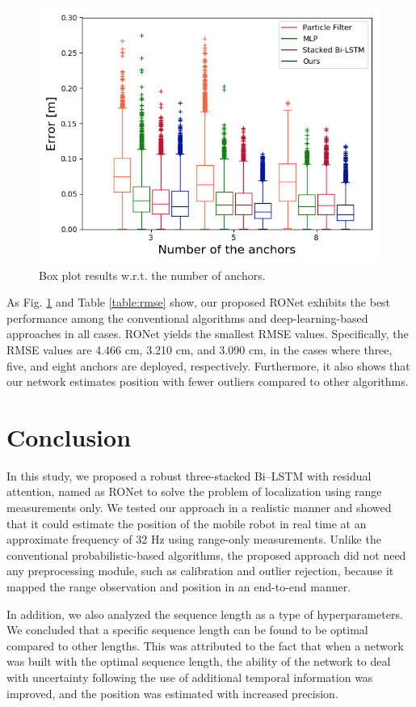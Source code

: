 \documentclass[letterpaper, 10 pt, conference]{ieeeconf}
\begin{document}
\begin{figure}[h]
	\centering
	\includegraphics[width=0.9\linewidth]{image/boxcompare}
	\caption{Box plot results w.r.t. the number of anchors.}
	\label{fig:box_plot} 	
\end{figure}

As Fig. \ref{fig:box_plot} and Table \ref{table:rmse} show, our proposed RONet exhibits the best performance among the conventional algorithms and deep-learning-based approaches in all cases. RONet yields the smallest RMSE values. Specifically, the RMSE values are 4.466 cm, 3.210 cm, and 3.090 cm, in the cases where three, five, and eight anchors are deployed, respectively. Furthermore, it also shows that our network estimates position with fewer outliers compared to other algorithms. 

\section{Conclusion}

In this study, we proposed a robust three-stacked Bi--LSTM with residual attention, named as RONet to solve the problem of localization using range measurements only. We tested our approach in a realistic manner and showed that it could estimate the position of the mobile robot in real time at an approximate frequency of 32 Hz using range-only measurements. Unlike the conventional probabilistic-based algorithms, the proposed approach did not need any preprocessing module, such as calibration and outlier rejection, because it mapped the range observation and position in an end-to-end manner.

In addition, we also analyzed the sequence length as a type of hyperparameters. We concluded that a specific sequence length can be found to be optimal compared to other lengths. This was attributed to the fact that when a network was built with the optimal sequence length, the ability of the network to deal with uncertainty following the use of additional temporal information was improved, and the position was estimated with increased precision.
\end{document}
